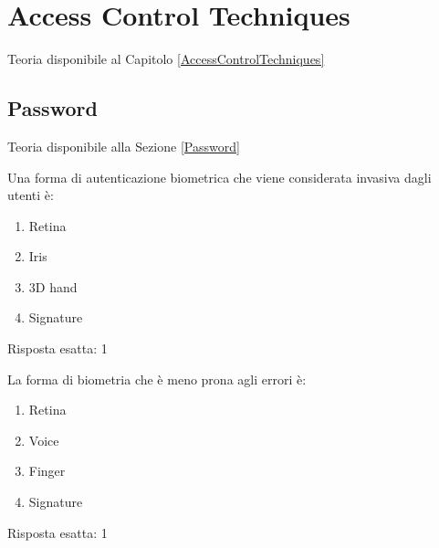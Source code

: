 \chapter{Access Control Techniques}

Teoria disponibile al Capitolo \ref{AccessControlTechniques}

\section{Password}
\label{EsPass}

Teoria disponibile alla Sezione \ref{Password}


\begin{Exercise} [
  title={Domanda},
  label={pass1}
 ]

 \Question Una forma di autenticazione biometrica che viene considerata
invasiva dagli utenti è:
\begin{enumerate}
 \item Retina
 \item Iris
 \item 3D hand
 \item Signature
\end{enumerate}

\end{Exercise}


\begin{Answer} [
  ref={pass1},
  number={1}
  ]

  \Question Risposta esatta: 1

\end{Answer}


\begin{Exercise} [
  title={Domanda},
  label={pass2}
 ]

 \Question La forma di biometria che è meno prona agli errori è:
\begin{enumerate}
\item Retina
\item Voice
\item Finger
\item Signature
\end{enumerate}


\end{Exercise}


\begin{Answer} [
  ref={pass2},
  number={2}
  ]

  \Question Risposta esatta: 1

\end{Answer}

